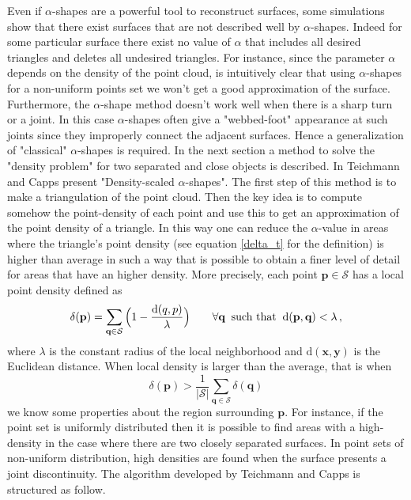 Even if $\alpha$-shapes are a powerful tool to reconstruct surfaces, some simulations show that there exist surfaces that are not described well by $ \alpha $-shapes. Indeed for some particular surface there exist no value of $\alpha$ that includes all desired triangles and deletes all undesired triangles. For instance, since the parameter $\alpha$ depends on the density of the point cloud, is intuitively clear that using $\alpha$-shapes for a non-uniform points set we won't get a good approximation of the surface. Furthermore, the $\alpha$-shape method doesn't work well when there is a sharp turn or a joint. In this case $\alpha$-shapes often give a "webbed-foot" appearance at such joints since they improperly connect the adjacent surfaces. Hence a generalization of "classical" $\alpha$-shapes is required. In the next section a method to solve the "density problem" for two separated and close objects is described.
In \cite{teichmann1998surface} Teichmann and Capps present "Density-scaled $\alpha$-shapes".
The first step of this method is to make a triangulation of the point cloud.
Then the key idea is to compute somehow the point-density of each point and use this to get an approximation of the point density of a triangle. In this way one can reduce the $\alpha$-value in areas where the triangle's point density (see equation \ref{delta_t} for the definition) is higher than average in such a way that is possible to obtain a finer level of detail for areas that have an higher density.
More precisely, each point $ \textbf{p}\in \mathcal{S} $ has a local point density defined as
\begin{equation}
\delta (\textbf{p})= \sum_{\textbf{q}\in \mathcal{S}}\Big( 1-\frac{\textrm{d}(q,p)}{\lambda}\Big) \qquad \forall \textbf{q} \mbox{\;\;such that\;\;} \textrm{d}(\textbf{p},\textbf{q})<\lambda\,,
\end{equation}
where $ \lambda $ is the constant radius of the local neighborhood and $\textrm{d}(\textbf{x},\textbf{y})$ is the Euclidean distance.
When local density is larger than the average, that is when
\begin{equation}
\delta (\textbf{p}) >\frac{1}{| \mathcal{S} |}\sum_{\textbf{q}\in \mathcal{S}}\delta (\textbf{q})
\end{equation}
we know some properties about the region surrounding $\textbf{p}$.
For instance, if the point set is uniformly distributed then it is possible to find areas with a high-density in the case where there are two closely separated surfaces.  In point sets of non-uniform distribution, high densities are found when the surface presents a joint discontinuity. The algorithm developed by Teichmann and Capps is structured as follow.
